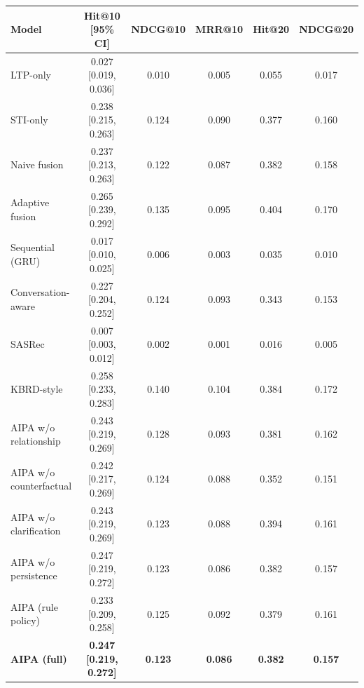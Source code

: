 \begin{tabular}{lccccc}
\toprule
Model & Hit@10 [95\% CI] & NDCG@10 & MRR@10 & Hit@20 & NDCG@20 \\
\midrule
LTP-only & 0.027 [0.019, 0.036] & 0.010 & 0.005 & 0.055 & 0.017 \\
STI-only & 0.238 [0.215, 0.263] & 0.124 & 0.090 & 0.377 & 0.160 \\
Naive fusion & 0.237 [0.213, 0.263] & 0.122 & 0.087 & 0.382 & 0.158 \\
Adaptive fusion & 0.265 [0.239, 0.292] & 0.135 & 0.095 & 0.404 & 0.170 \\
Sequential (GRU) & 0.017 [0.010, 0.025] & 0.006 & 0.003 & 0.035 & 0.010 \\
Conversation-aware & 0.227 [0.204, 0.252] & 0.124 & 0.093 & 0.343 & 0.153 \\
SASRec & 0.007 [0.003, 0.012] & 0.002 & 0.001 & 0.016 & 0.005 \\
KBRD-style & 0.258 [0.233, 0.283] & 0.140 & 0.104 & 0.384 & 0.172 \\
\midrule
AIPA w/o relationship & 0.243 [0.219, 0.269] & 0.128 & 0.093 & 0.381 & 0.162 \\
AIPA w/o counterfactual & 0.242 [0.217, 0.269] & 0.124 & 0.088 & 0.352 & 0.151 \\
AIPA w/o clarification & 0.243 [0.219, 0.269] & 0.123 & 0.088 & 0.394 & 0.161 \\
AIPA w/o persistence & 0.247 [0.219, 0.272] & 0.123 & 0.086 & 0.382 & 0.157 \\
AIPA (rule policy) & 0.233 [0.209, 0.258] & 0.125 & 0.092 & 0.379 & 0.161 \\
\textbf{AIPA (full)} & \textbf{0.247 [0.219, 0.272]} & \textbf{0.123} & \textbf{0.086} & \textbf{0.382} & \textbf{0.157} \\
\bottomrule
\end{tabular}
